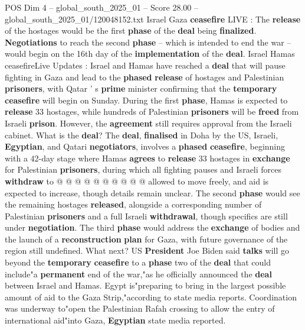\begin{textsample}{POS Dim 4 – global\_south\_2025\_01 – Score 28.00 – global\_south\_2025\_01/120048152.txt}  \label{ex:f4_pos_004}
Israel Gaza \textbf{ceasefire} LIVE : The \textbf{release} of the hostages would be the first \textbf{phase} of the \textbf{deal} being \textbf{finalized}. \textbf{Negotiations} to reach the second \textbf{phase} -- which is intended to end the war -- would begin on the 16th day of the \textbf{implementation} of the \textbf{deal}.
Israel Hamas ceasefireLive Updates : Israel and Hamas have reached a \textbf{deal} that will pause fighting in Gaza and lead to the \textbf{phased} \textbf{release} of hostages and Palestinian \textbf{prisoners}, with Qatar ' s \textbf{prime} minister confirming that the \textbf{temporary} \textbf{ceasefire} will begin on Sunday.
During the first \textbf{phase}, Hamas is expected to \textbf{release} 33 hostages, while hundreds of Palestinian \textbf{prisoners} will be \textbf{freed} from Israeli \textbf{prison}.
However, the \textbf{agreement} still requires approval from the Israeli cabinet.
What is the \textbf{deal}?
The \textbf{deal}, \textbf{finalised} in Doha by the US, Israeli, \textbf{Egyptian}, and Qatari \textbf{negotiators}, involves a \textbf{phased} \textbf{ceasefire}, beginning with a 42-day stage where Hamas \textbf{agrees} to \textbf{release} 33 hostages in \textbf{exchange} for Palestinian \textbf{prisoners}, during which all fighting pauses and Israeli forces \textbf{withdraw} to @ @ @ @ @ @ @ @ @ @ allowed to move freely, and aid is expected to increase, though details remain unclear.
The second \textbf{phase} would see the remaining hostages \textbf{released}, alongside a corresponding number of Palestinian \textbf{prisoners} and a full Israeli \textbf{withdrawal}, though specifics are still under \textbf{negotiation}.
The third \textbf{phase} would address the \textbf{exchange} of bodies and the launch of a \textbf{reconstruction} \textbf{plan} for Gaza, with future governance of the region still undefined.
What next?
US \textbf{President} Joe Biden said \textbf{talks} will go beyond the \textbf{temporary} \textbf{ceasefire} to a \textbf{phase} two of the \textbf{deal} that could include"a \textbf{permanent} end of the war,"as he officially announced the \textbf{deal} between Israel and Hamas.
Egypt is"preparing to bring in the largest possible amount of aid to the Gaza Strip,"according to state media reports.
Coordination was underway to"open the Palestinian Rafah crossing to allow the entry of international aid"into Gaza, \textbf{Egyptian} state media reported.

\end{textsample}
